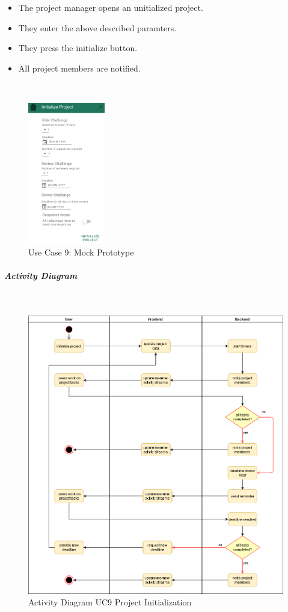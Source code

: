 \begin{itemize}
	\vspace{-3mm}
	\setlength\itemsep{-1em}
	\item The project manager opens an unitialized project.
	\item They enter the above described paramters.
	\item They press the initialize button.
	\item All project members are notified.
\end{itemize} 
\\
\begin{figure}[H]
	\centering
	\includegraphics[width=0.3\textwidth]{Assets/UC_Screenshots/UC9S.png}
	\caption{Use Case 9: Mock Prototype}
	\label{fig:useCase9Detail}
\end{figure}
\newpage
\subparagraph{Activity Diagram}\mbox{}\\
\begin{figure}[H]
	\centering
	\includegraphics[width=1.0\textwidth]{Content/Domain/UC9Initialization.png}
	\caption{Activity Diagram  \ac{UC}9 Project Initialization}
	\label{fig:label14}
\end{figure}
\newpage
